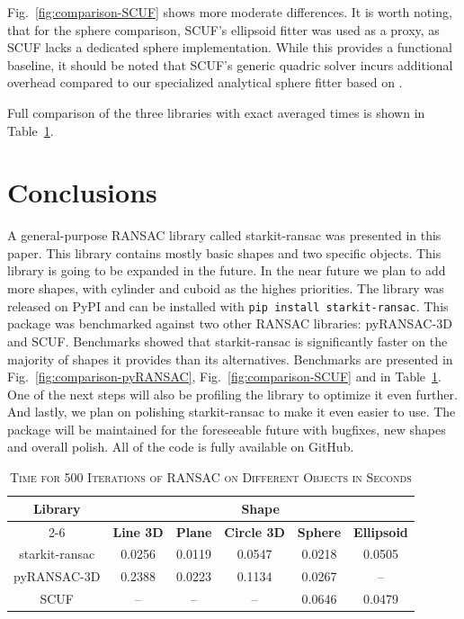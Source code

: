 \documentclass[10pt,conference,a4paper]{IEEEtran_EDM}
\begin{document}
Fig.~\ref{fig:comparison-SCUF} shows more moderate differences. It is worth
noting, that for the sphere comparison, SCUF's ellipsoid fitter was used as a
proxy, as SCUF lacks a dedicated sphere implementation. While this provides a
functional baseline, it should be noted that SCUF's generic quadric solver
incurs additional overhead compared to our specialized analytical sphere
fitter based on \cite{bourke_circlesphere}.

Full comparison of the three libraries with exact averaged times is shown in Table~\ref{tab:final}.

\section{Conclusions}

A general-purpose RANSAC library called starkit-ransac was presented in this
paper. This library contains mostly basic shapes and two specific objects.
This library is going to be expanded in the future. In the near future we
plan to add more shapes, with cylinder and cuboid as the highes priorities.
The library was released on PyPI and can be installed with \texttt{pip install
starkit-ransac}. This package was benchmarked against two other RANSAC
libraries: pyRANSAC-3D and SCUF. Benchmarks showed that starkit-ransac is
significantly faster on the majority of shapes it provides than its
alternatives. Benchmarks are presented in Fig.~\ref{fig:comparison-pyRANSAC},
Fig.~\ref{fig:comparison-SCUF} and in Table~\ref{tab:final}. One of the next
steps will also be profiling the library to optimize it even further. And
lastly, we plan on polishing starkit-ransac to make it even easier to use. The
package will be maintained for the foreseeable future with bugfixes, new shapes
and overall polish. All of the code is fully available on GitHub\cite{skorobogatov2026starkit}.

\begin{table}[htbp]
\captionsetup{font=footnotesize}
\caption{\textsc{Time for 500 Iterations of RANSAC on Different Objects in Seconds}}
\centering
\setlength{\tabcolsep}{19.5pt}
\begin{tabular}{|c|c|c|c|c|c|}
\hline
\multirow{2}{*}{\tableheadsize\textbf{Library}} & \multicolumn{5}{c|}{\tableheadsize\textbf{Shape}} \\
\cline{2-6}
 & \tablesubheadsize\textbf{Line 3D} & \tablesubheadsize\textbf{Plane} & \tablesubheadsize\textbf{Circle 3D} & \tablesubheadsize\textbf{Sphere} & \tablesubheadsize\textbf{Ellipsoid} \\
\hline
starkit-ransac & 0.0256 & 0.0119 & 0.0547  & 0.0218 & 0.0505 \\
pyRANSAC-3D    &         0.2388  &         0.0223  &          0.1134  &         0.0267  &   --   \\
SCUF           &           --    &           --    &            --    &         0.0646  & 0.0479 \\
\hline
\end{tabular}
\label{tab:final}
\end{table}

\printbibliography
\end{document}
